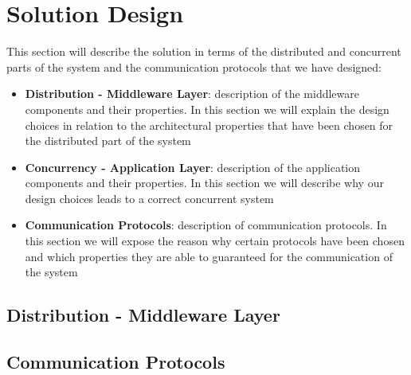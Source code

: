 \section{Solution Design}

This section will describe the solution in terms of the distributed and concurrent parts of the system and the communication protocols that we have designed:

\begin{itemize}
\item \textbf{Distribution - Middleware Layer}: 
	description of the middleware components and their properties. In this section we will explain the design choices in relation to the architectural properties that have been chosen 
	for the distributed part of the system
\item \textbf{Concurrency - Application Layer}: 
	description of the application components and their properties. In this section we will describe why our design choices leads to a correct concurrent system 
\item \textbf{Communication Protocols}: 
	description of communication protocols. In this section we will expose the reason why certain protocols have been chosen and which properties they are able to guaranteed for 
	the communication of the system
\end{itemize}

\subsection{Distribution - Middleware Layer}



\subsection{Communication Protocols}

